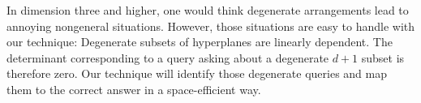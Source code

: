 In dimension three and higher, one would think degenerate arrangements lead to
annoying nongeneral situations. However, those situations are easy to handle
with our technique: Degenerate subsets of hyperplanes are linearly dependent.
The determinant corresponding to a query asking about a
degenerate \(d+1\) subset is therefore zero. Our technique will identify those
degenerate queries and map them to the correct answer in a space-efficient way.


